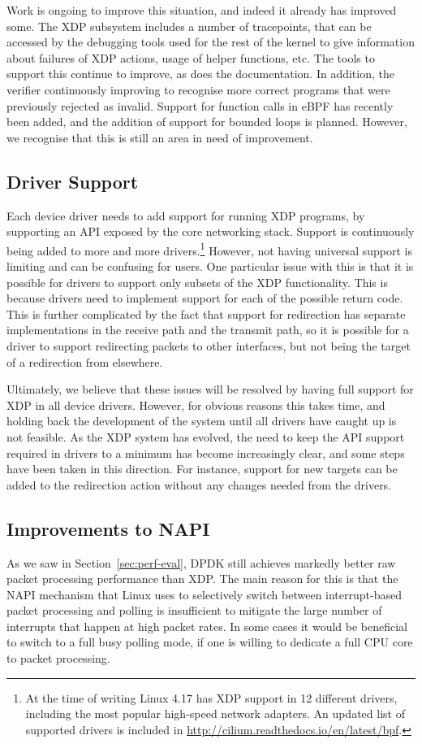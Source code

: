 \documentclass[10pt,sigconf]{acmart}
\begin{document}
Work is ongoing to improve this situation, and indeed it already has improved
some. The XDP subsystem includes a number of tracepoints, that can be accessed
by the debugging tools used for the rest of the kernel to give information about
failures of XDP actions, usage of helper functions, etc. The tools to support
this continue to improve, as does the documentation. In addition, the verifier
continuously improving to recognise more correct programs that were previously
rejected as invalid. Support for function calls in eBPF has recently been added,
and the addition of support for bounded loops is planned. However, we recognise
that this is still an area in need of improvement.

\subsection{Driver Support}
\label{sec:driver-support}
Each device driver needs to add support for running XDP programs, by supporting
an API exposed by the core networking stack. Support is continuously being added
to more and more drivers.\footnote{At the time of writing Linux 4.17 has XDP
  support in 12 different drivers, including the most popular high-speed network
  adapters. An updated list of supported drivers is included in
  \url{http://cilium.readthedocs.io/en/latest/bpf}.} However, not having
universal support is limiting and can be confusing for users. One particular
issue with this is that it is possible for drivers to support only subsets of
the XDP functionality. This is because drivers need to implement support for
each of the possible return code. This is further complicated by the fact that
support for redirection has separate implementations in the receive path and the
transmit path, so it is possible for a driver to support redirecting packets to
other interfaces, but not being the target of a redirection from elsewhere.

Ultimately, we believe that these issues will be resolved by having full support
for XDP in all device drivers. However, for obvious reasons this takes time, and
holding back the development of the system until all drivers have caught up is
not feasible. As the XDP system has evolved, the need to keep the API support
required in drivers to a minimum has become increasingly clear, and some steps
have been taken in this direction. For instance, support for new targets can be
added to the redirection action without any changes needed from the drivers.

\subsection{Improvements to NAPI}
\label{sec:improvements-napi}
As we saw in Section~\ref{sec:perf-eval}, DPDK still achieves markedly better
raw packet processing performance than XDP. The main reason for this is that the
NAPI mechanism that Linux uses to selectively switch between interrupt-based
packet processing and polling is insufficient to mitigate the large number of
interrupts that happen at high packet rates. In some cases it would be
beneficial to switch to a full busy polling mode, if one is willing to dedicate
a full CPU core to packet processing.
\end{document}
